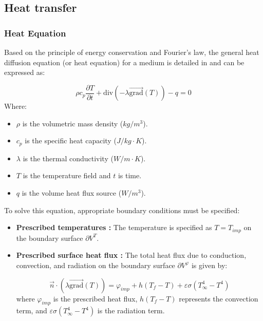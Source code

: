 \subsection{Heat transfer}

\subsubsection{Heat Equation} \label{sec:heat_equation}
Based on the principle of energy conservation and Fourier's law, the general heat diffusion equation (or heat equation) for a medium is detailed in \cite{dipaola2023} and can be expressed as:

\begin{equation}
    \rho c_p \frac{\partial T}{\partial t} + \text{div}(-\lambda \overrightarrow{\text{grad}}(T)) - q = 0
    \label{eq:heat}
\end{equation}
Where:
\begin{itemize}
    \item $\rho$ is the volumetric mass density ($kg/m^3$).
    \item $c_p$ is the specific heat capacity ($J/kg \cdot K$).
    \item $\lambda$ is the thermal conductivity ($W/m \cdot K$).
    \item $T$ is the temperature field and $t$ is time.
    \item $q$ is the volume heat flux source ($W/m^3$).
\end{itemize}

To solve this equation, appropriate boundary conditions must be specified:
\begin{itemize}
    \item \textbf{Prescribed temperatures :} The temperature is specified as $T = T_{imp}$ on the boundary surface $\partial V^T$.
    \item \textbf{Prescribed surface heat flux :} The total heat flux due to conduction, convection, and radiation on the boundary surface $\partial V^\varphi$ is given by:

    \begin{equation}
        \vec{n} \cdot (\lambda \overrightarrow{\text{grad}}(T)) = \varphi_{imp} + h(T_f - T) + \varepsilon \sigma (T_\infty^4 - T^4)
        \label{eq:thermal_bc}
    \end{equation}
    where $\varphi_{imp}$ is the prescribed heat flux, $h(T_f - T)$ represents the convection term, and $\varepsilon \sigma (T_\infty^4 - T^4)$ is the radiation term.
\end{itemize}

